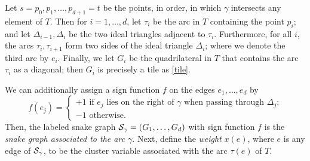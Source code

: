 Let $s = p_0,p_1,\dots,p_{d+1} = t$ be the points, in order, in which $\gamma$ intersects any element of $T$. Then for $i = 1,\dots,d$, let $\tau_i$ be the arc in $T$ containing the point $p_i$; and let $\Delta_{i-1}, \Delta_i$ be the two ideal triangles adjacent to $\tau_i$. Furthermore, for all $i$, the arcs $\tau_i,\tau_{i+1}$ form two sides of the ideal triangle $\Delta_i$; where we denote the third arc by $e_i$. Finally, we let $G_i$ be the quadrilateral in $T$ that contains the arc $\tau_i$ as a diagonal; then $G_i$ is precisely a tile as \ref{tile}. 

We can additionally assign a sign function $f$ on the edges $e_1,\dots,e_d$ by
\begin{equation*}
    f(e_j) = \begin{cases}
        +1 \text{ if $e_j$ lies on the right of $\gamma$ when passing through $\Delta_j$;} \\
        -1 \text{ otherwise.}
    \end{cases}
\end{equation*}
Then, the labeled snake graph $\mathcal{S}_{\gamma} = (G_1,\dots,G_d)$ with sign function $f$ is the \emph{snake graph associated to the arc $\gamma$}. Next, define the \emph{weight} $x(e)$, where $e$ is any edge of $\mathcal{S}_{\gamma}$, to be the cluster variable associated with the arc $\tau(e)$ of $T$. 
